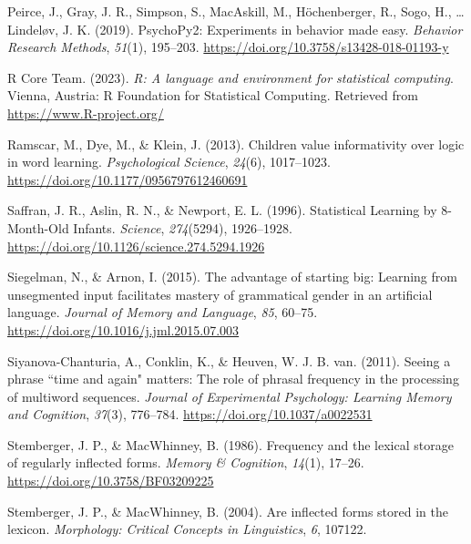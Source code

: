 \documentclass[
  man,floatsintext]{apa6}
\newlength{\cslhangindent}
\newlength{\cslentryspacingunit} %
\newenvironment{CSLReferences}[2] %
 {%
  \setlength{\parindent}{0pt}
  \ifodd #1
  \let\oldpar\par
  \def\par{\hangindent=\cslhangindent\oldpar}
  \fi
  \setlength{\parskip}{#2\cslentryspacingunit}
 }%
 {}
\begin{document}
\begin{CSLReferences}{1}{0}
\leavevmode{}%
Peirce, J., Gray, J. R., Simpson, S., MacAskill, M., Höchenberger, R., Sogo, H., \ldots{} Lindeløv, J. K. (2019). PsychoPy2: Experiments in behavior made easy. \emph{Behavior Research Methods}, \emph{51}(1), 195--203. \url{https://doi.org/10.3758/s13428-018-01193-y}

\leavevmode{}%
R Core Team. (2023). \emph{R: A language and environment for statistical computing}. Vienna, Austria: R Foundation for Statistical Computing. Retrieved from \url{https://www.R-project.org/}

\leavevmode{}%
Ramscar, M., Dye, M., \& Klein, J. (2013). Children value informativity over logic in word learning. \emph{Psychological Science}, \emph{24}(6), 1017--1023. \url{https://doi.org/10.1177/0956797612460691}

\leavevmode{}%
Saffran, J. R., Aslin, R. N., \& Newport, E. L. (1996). Statistical Learning by 8-Month-Old Infants. \emph{Science}, \emph{274}(5294), 1926--1928. \url{https://doi.org/10.1126/science.274.5294.1926}

\leavevmode{}%
Siegelman, N., \& Arnon, I. (2015). The advantage of starting big: Learning from unsegmented input facilitates mastery of grammatical gender in an artificial language. \emph{Journal of Memory and Language}, \emph{85}, 60--75. \url{https://doi.org/10.1016/j.jml.2015.07.003}

\leavevmode{}%
Siyanova-Chanturia, A., Conklin, K., \& Heuven, W. J. B. van. (2011). Seeing a phrase {``}time and again{"} matters: The role of phrasal frequency in the processing of multiword sequences. \emph{Journal of Experimental Psychology: Learning Memory and Cognition}, \emph{37}(3), 776--784. \url{https://doi.org/10.1037/a0022531}

\leavevmode{}%
Stemberger, J. P., \& MacWhinney, B. (1986). Frequency and the lexical storage of regularly inflected forms. \emph{Memory \& Cognition}, \emph{14}(1), 17--26. \url{https://doi.org/10.3758/BF03209225}

\leavevmode{}%
Stemberger, J. P., \& MacWhinney, B. (2004). Are inflected forms stored in the lexicon. \emph{Morphology: Critical Concepts in Linguistics}, \emph{6}, 107122.


\end{CSLReferences}
\end{document}
